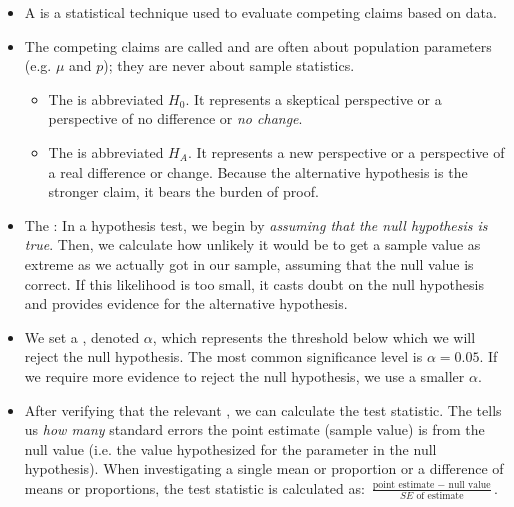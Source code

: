 \begin{itemize}
\item A  is a statistical technique used to evaluate competing claims based on data.  

\item The competing claims are called  and are often about population parameters (e.g. $\mu$ and $p$); they are never about sample statistics.  \vspace{-1mm}
\begin{itemize}
\item The  is abbreviated $H_0$. It represents a skeptical perspective or a perspective of no difference or \emph{no change}.
\item The  is abbreviated $H_A$. It represents a new perspective or a perspective of a real difference or change.  Because the alternative hypothesis is the stronger claim, it bears the burden of proof.  
\end{itemize}

\item The :  In a hypothesis test, we begin by \textit{assuming that the null hypothesis is true}.  Then, we calculate how unlikely it would be to get a sample value as extreme as we actually got in our sample, assuming that the null value is correct.  If this likelihood is too small, it casts doubt on the null hypothesis and provides evidence for the alternative hypothesis.

\item We set a , denoted $\alpha$, which represents the threshold below which we will reject the null hypothesis.  The most common significance level is $\alpha = 0.05$.  If we require more evidence to reject the null hypothesis, we use a smaller $\alpha$.

\item After verifying that the relevant , we can calculate the test statistic.  The  tells us \textit{how many} standard errors the point estimate (sample value) is from the null value (i.e. the value hypothesized for the parameter in the null hypothesis).  When investigating a single mean or proportion or a difference of means or proportions, the test statistic is calculated as: $\frac{\text{point estimate } -\text{ null value}}{SE \text{ of estimate}}$.


\end{itemize}
